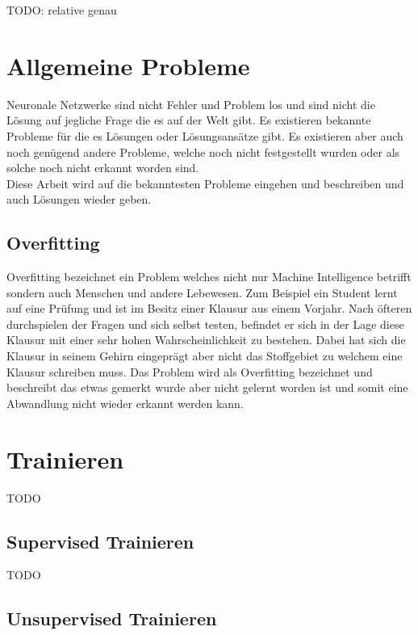 TODO: relative genau

\section{Allgemeine Probleme}

Neuronale Netzwerke sind nicht Fehler und Problem los und sind nicht die Lösung auf jegliche Frage die es auf der Welt gibt. 
Es existieren bekannte Probleme für die es Lösungen oder Lösungsansätze gibt. 
Es existieren aber auch noch genügend andere Probleme, welche noch nicht festgestellt wurden oder als solche noch nicht erkannt worden sind. \\

Diese Arbeit wird auf die bekanntesten Probleme eingehen und beschreiben und auch Lösungen wieder geben.

\subsection{Overfitting}

Overfitting bezeichnet ein Problem welches nicht nur Machine Intelligence betrifft sondern auch Menschen und andere Lebewesen. 
Zum Beispiel ein Student lernt auf eine Prüfung und ist im Besitz einer Klausur aus einem Vorjahr. 
Nach öfteren durchspielen der Fragen und sich selbst testen, befindet er sich in der Lage diese Klausur mit einer sehr hohen Wahrscheinlichkeit zu bestehen. 
Dabei hat sich die Klausur in seinem Gehirn eingeprägt aber nicht das Stoffgebiet zu welchem eine Klausur schreiben muss. 
Das Problem wird als Overfitting bezeichnet und beschreibt das etwas gemerkt wurde aber nicht gelernt worden ist und somit eine Abwandlung nicht wieder erkannt werden kann.

\section{Trainieren}

TODO

\subsection{Supervised Trainieren}

TODO

\subsection{Unsupervised Trainieren}

